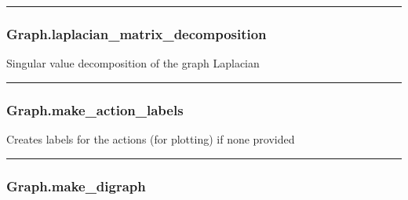 \begin{center}\rule{0.5\linewidth}{\linethickness}\end{center}

\hypertarget{graph.laplacian_matrix_decomposition}{%
\subsubsection{Graph.laplacian\_matrix\_decomposition}\label{graph.laplacian_matrix_decomposition}}

\begin{Shaded}
\begin{Highlighting}[]
\NormalTok{)}
\end{Highlighting}
\end{Shaded}

Singular value decomposition of the graph Laplacian

\begin{center}\rule{0.5\linewidth}{\linethickness}\end{center}

\hypertarget{graph.make_action_labels}{%
\subsubsection{Graph.make\_action\_labels}\label{graph.make_action_labels}}

\begin{Shaded}
\begin{Highlighting}[]
\NormalTok{)}
\end{Highlighting}
\end{Shaded}

Creates labels for the actions (for plotting) if none provided

\begin{center}\rule{0.5\linewidth}{\linethickness}\end{center}

\hypertarget{graph.make_digraph}{%
\subsubsection{Graph.make\_digraph}\label{graph.make_digraph}}

\begin{Shaded}
\begin{Highlighting}[]
\NormalTok{)}
\end{Highlighting}
\end{Shaded}

